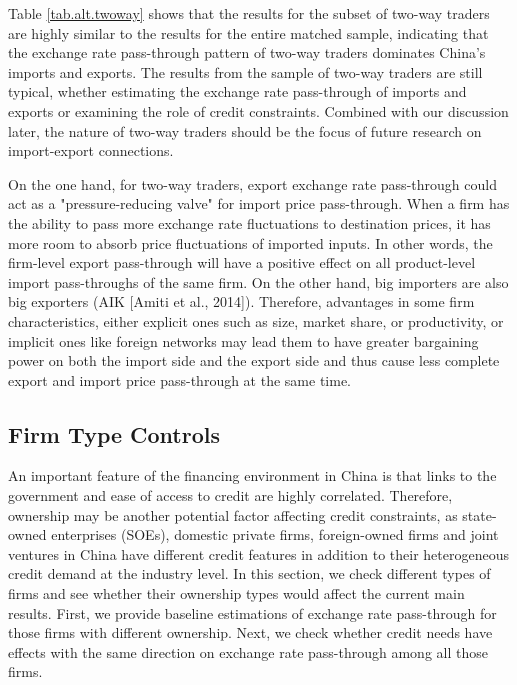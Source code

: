 \documentclass[12pt]{article}
\begin{document}
Table \ref{tab.alt.twoway} shows that the results for the subset of two-way traders are highly similar to the results for the entire matched sample, indicating that the exchange rate pass-through pattern of two-way traders dominates China’s imports and exports. The results from the sample of two-way traders are still typical, whether estimating the exchange rate pass-through of imports and exports or examining the role of credit constraints. Combined with our discussion later, the nature of two-way traders should be the focus of future research on import-export connections.

On the one hand, for two-way traders, export exchange rate pass-through could act as a "pressure-reducing valve" for import price pass-through. When a firm has the ability to pass more exchange rate fluctuations to destination prices, it has more room to absorb price fluctuations of imported inputs. In other words, the firm-level export pass-through will have a positive effect on all product-level import pass-throughs of the same firm.
On the other hand, big importers are also big exporters (AIK [Amiti et al., 2014]).
Therefore, advantages in some firm characteristics, either explicit ones such as size, market
share, or productivity, or implicit ones like foreign networks may lead them to have
greater bargaining power on both the import side and the export side and thus cause less
complete export and import price pass-through at the same time.

\subsection{Firm Type Controls}

An important feature of the financing environment in China is that links to the government and ease of access to credit are highly correlated. Therefore, ownership may be another potential factor affecting credit constraints, as state-owned enterprises (SOEs), domestic private firms, foreign-owned firms and joint ventures in China have different credit features in addition to their heterogeneous credit demand at the industry level. In this section, we check different types of firms and see whether their ownership types would affect the current main results. First, we provide baseline estimations of exchange rate pass-through for those firms with different ownership. Next, we check whether credit needs have effects with the same direction on exchange rate pass-through among all those firms.
\end{document}
